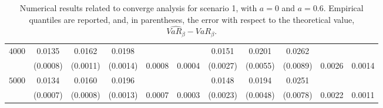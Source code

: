 \documentclass[preprint,12pt]{article}
\begin{document}
\begin{table}[h!]
\begin{tabular}{l|ccccc|ccccc|}
\multirow{2}{*}{$4000$} 
   & 0.0135  &  0.0162  &  0.0198 & & & 0.0151  &  0.0201  &  0.0262& &\\
   & (0.0008)  &  (0.0011)  &  (0.0014) & 0.0008 & 0.0004 & (0.0027)  & (0.0055) & (0.0089) & 0.0026 & 0.0014\\
\midrule

\multirow{2}{*}{$5000$} 
   & 0.0134 & 0.0160 & 0.0196 & & & 0.0148 & 0.0194 & 0.0251 & &\\
   & (0.0007) &   (0.0008)  &  (0.0013) & 0.0007 & 0.0003 &  (0.0023)  &  (0.0048)  &  (0.0078) & 0.0022 & 0.0011\\
\hline \hline
\end{tabular}
\caption{Numerical results related to converge analysis for scenario 1, with $a=0$ and $a=0.6$. Empirical quantiles are reported, and, in parentheses, the error with respect to the theoretical value, $\widehat{VaR_{\beta}} - VaR_{\beta}$.  }
\label{Tab:convscenario1}
\end{table}
\end{document}
